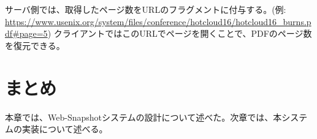 サーバ側では、取得したページ数をURLのフラグメントに付与する。(例: \url{https://www.usenix.org/system/files/conference/hotcloud16/hotcloud16_burns.pdf#page=5})
クライアントではこのURLでページを開くことで、PDFのページ数を復元できる。

\section{まとめ}
本章では、Web-Snapshotシステムの設計について述べた。次章では、本システムの実装について述べる。
